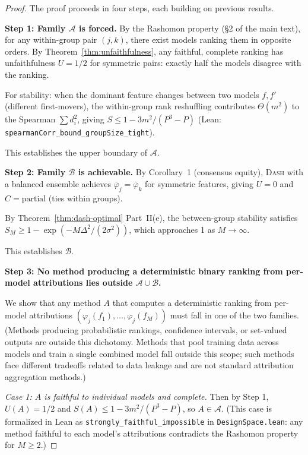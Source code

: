 \documentclass{article}
\newcommand{\DASH}{\textsc{Dash}}
\begin{document}
\begin{proof}
The proof proceeds in four steps, each building on previous results.

\textbf{Step 1: Family $\mathcal{A}$ is forced.}
By the Rashomon property (\S2 of the main text), for any within-group pair
$(j,k)$, there exist models ranking them in opposite orders.
By Theorem~\ref{thm:unfaithfulness}, any faithful, complete ranking
has unfaithfulness $U = 1/2$ for symmetric pairs: exactly half the
models disagree with the ranking.

For stability: when the dominant feature changes between two models
$f, f'$ (different first-movers), the within-group rank reshuffling
contributes $\Theta(m^2)$ to the Spearman $\sum d_i^2$, giving
$S \leq 1 - 3m^2/(P^3{-}P)$ (Lean: \texttt{spearmanCorr\_bound\_group\-Size\_tight}).

This establishes the upper boundary of $\mathcal{A}$.

\textbf{Step 2: Family $\mathcal{B}$ is achievable.}
By Corollary~1 (consensus equity), \DASH{} with a balanced ensemble
achieves $\bar\varphi_j = \bar\varphi_k$ for symmetric features,
giving $U = 0$ and $C = \text{partial}$ (ties within groups).

By Theorem~\ref{thm:dash-optimal} Part~II(e), the between-group
stability satisfies
$S_M \geq 1 - \exp(-M\Delta^2/(2\sigma^2))$,
which approaches 1 as $M \to \infty$.

This establishes $\mathcal{B}$.

\textbf{Step 3: No method producing a deterministic binary ranking from per-model attributions lies outside $\mathcal{A} \cup \mathcal{B}$.}

We show that any method $A$ that computes a deterministic ranking from per-model
attributions $(\varphi_j(f_1), \ldots, \varphi_j(f_M))$ must fall
in one of the two families. (Methods producing probabilistic rankings, confidence intervals, or set-valued outputs are outside this dichotomy. Methods that pool training data across
models and train a single combined model fall outside this scope;
such methods face different tradeoffs related to data leakage and
are not standard attribution aggregation methods.)

\emph{Case 1: $A$ is faithful to individual models and complete.}
Then by Step 1, $U(A) = 1/2$ and $S(A) \leq 1 - 3m^2/(P^3{-}P)$,
so $A \in \mathcal{A}$.
(This case is formalized in Lean as \texttt{strongly\_faithful\_impossible}
in \texttt{DesignSpace.lean}: any method faithful to each model's
attributions contradicts the Rashomon property for $M \geq 2$.)


\end{proof}
\end{document}
